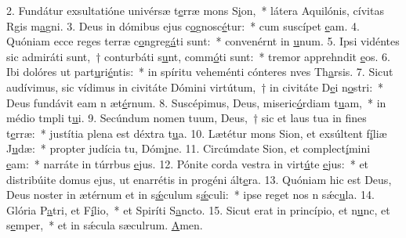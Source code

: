 2. Fundátur exsultatióne univérsæ t\uline{e}rræ mons S\uline{i}on,~* látera Aquilónis, cívitas Rgis m\uline{a}gni.
3. Deus in dómibus ejus c\uline{o}gnosc\uline{é}tur:~* cum suscípet \uline{e}am.
4. Quóniam ecce reges terræ c\uline{o}ngreg\uline{á}ti sunt:~* convenérnt in \uline{u}num.
5. Ipsi vidéntes sic admiráti sunt,~† conturbáti s\uline{u}nt, comm\uline{ó}ti sunt:~* tremor apprehndit \uline{e}os.
6. Ibi dolóres ut part\uline{u}ri\uline{é}ntis:~* in spíritu veheménti cónteres nves Th\uline{a}rsis.
7. Sicut audívimus, sic vídimus in civitáte Dómini virtútum,~† in civitáte D\uline{e}i n\uline{o}stri:~* Deus fundávit eam n æt\uline{é}rnum.
8. Suscépimus, Deus, miseric\uline{ó}rdiam t\uline{u}am,~* in médio tmpli t\uline{u}i.
9. Secúndum nomen tuum, Deus,~† sic et laus tua in f\uline{i}nes t\uline{e}rræ:~* justítia plena est déxtra t\uline{u}a.
10. Lætétur mons Sion, et exsúltent f\uline{í}liæ J\uline{u}dæ:~* propter judícia tu, Dóm\uline{i}ne.
11. Circúmdate Sion, et complect\uline{í}mini \uline{e}am:~* narráte in túrrbus \uline{e}jus.
12. Pónite corda vestra in virt\uline{ú}te \uline{e}jus:~* et distribúite domus ejus, ut enarrétis in progéni ált\uline{e}ra.
13. Quóniam hic est Deus, Deus noster in ætérnum et in s\uline{ǽ}culum s\uline{ǽ}culi:~* ipse reget nos n sǽc\uline{u}la.
14. Glória P\uline{a}tri, et F\uline{í}lio,~* et Spiríti S\uline{a}ncto.
15. Sicut erat in princípio, et n\uline{u}nc, et s\uline{e}mper,~* et in sǽcula sæculrum. \uline{A}men.
